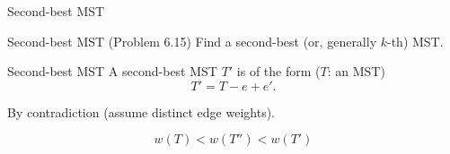 \begin{frame}{Second-best MST}
  \begin{exampleblock}{Second-best MST (Problem 6.15)}
	Find a second-best (or, generally $k$-th) MST.
  \end{exampleblock}

  \begin{theorem}{Second-best MST}
	A second-best MST $T'$ is of the form ($T$: an MST)
	\[
	  T' = T - e + e'.
	\]
  \end{theorem}

  \centerline{By contradiction (assume distinct edge weights).}

  \[
	w(T) < w(T'') < w(T')
  \]
\end{frame}
